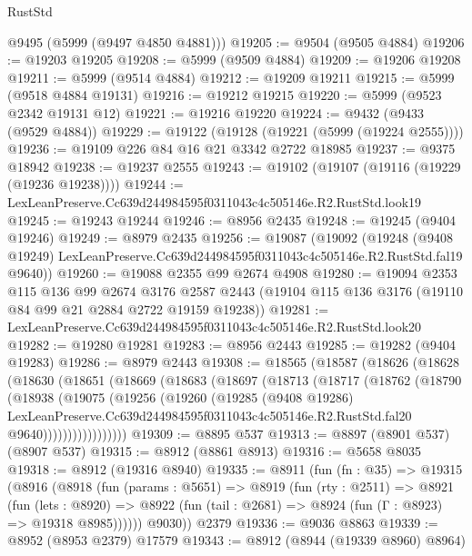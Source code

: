 \begin{lexlean}{RustStd}
\begin{coremodule}
      @9495
      (@5999 (@9497 @4850 @4881)))
@19205 := @9504 (@9505 @4884)
@19206 := @19203 @19205
@19208 := @5999 (@9509 @4884)
@19209 := @19206 @19208
@19211 := @5999 (@9514 @4884)
@19212 := @19209 @19211
@19215 := @5999 (@9518 @4884 @19131)
@19216 := @19212 @19215
@19220 := @5999 (@9523 @2342 @19131 @12)
@19221 := @19216 @19220
@19224 := @9432 (@9433 (@9529 @4884))
@19229 := @19122 (@19128 (@19221 (@5999 (@19224 @2555))))
@19236 := @19109 @226 @84 @16 @21 @3342 @2722 @18985
@19237 := @9375 @18942
@19238 := @19237 @2555
@19243 := @19102 (@19107 (@19116 (@19229 (@19236 @19238))))
@19244 := LexLeanPreserve.Cc639d244984595f0311043c4c505146e.R2.RustStd.look19
@19245 := @19243 @19244
@19246 := @8956 @2435
@19248 := @19245 (@9404 @19246)
@19249 := @8979 @2435
@19256 := @19087
    (@19092
      (@19248
        (@9408 @19249)
        LexLeanPreserve.Cc639d244984595f0311043c4c505146e.R2.RustStd.fal19
        @9640))
@19260 := @19088 @2355 @99 @2674 @4908
@19280 := @19094
    @2353
    @115
    @136
    @99
    @2674
    @3176
    @2587
    @2443
    (@19104 @115 @136 @3176 (@19110 @84 @99 @21 @2884 @2722 @19159 @19238))
@19281 := LexLeanPreserve.Cc639d244984595f0311043c4c505146e.R2.RustStd.look20
@19282 := @19280 @19281
@19283 := @8956 @2443
@19285 := @19282 (@9404 @19283)
@19286 := @8979 @2443
@19308 := @18565
    (@18587
      (@18626
        (@18628
          (@18630
            (@18651
              (@18669
                (@18683
                  (@18697
                    (@18713
                      (@18717
                        (@18762
                          (@18790
                            (@18938
                              (@19075
                                (@19256
                                  (@19260
                                    (@19285
                                      (@9408 @19286)
                                      LexLeanPreserve.Cc639d244984595f0311043c4c505146e.R2.RustStd.fal20
                                      @9640)))))))))))))))))
@19309 := @8895 @537
@19313 := @8897 (@8901 @537) (@8907 @537)
@19315 := @8912 (@8861 @8913)
@19316 := @5658 @8035
@19318 := @8912 (@19316 @8940)
@19335 := @8911
    (fun (fn : @35) =>
    @19315
      (@8916
        (@8918
          (fun (params : @5651) =>
          @8919
            (fun (rty : @2511) =>
            @8921
              (fun (lets : @8920) =>
              @8922 (fun (tail : @2681) => @8924 (fun (Γ : @8923) => @19318 @8985))))))
        @9030))
    @2379
@19336 := @9036 @8863
@19339 := @8952 (@8953 @2379) @17579
@19343 := @8912 (@8944 (@19339 @8960) @8964)

\end{coremodule}
\end{lexlean}
